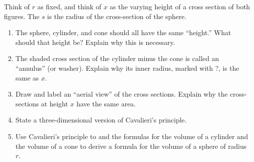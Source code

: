 \documentclass[nooutcomes]{ximera}
\begin{document}
\begin{problem}
\begin{center}
{}
\end{center}
Think of $r$ as fixed, and think of $x$ as the varying height of a cross section of both figures.  The $s$ is the radius of the cross-section of the sphere.  
\begin{enumerate}
\item The sphere, cylinder, and cone should all have the same ``height.''  What should that height be?  Explain why this is necessary.  
\item The shaded cross section of the cylinder minus the cone is called an ``annulus'' (or washer).  Explain why its inner radius, marked with $?$, is the same as $x$. 
\item Draw and label an ``aerial view'' of the cross sections.   Explain why the cross-sections at height $x$ have the same area.  
\item State a three-dimensional version of Cavalieri's principle.  
\item Use Cavalieri's principle to and the formulas for the volume of a cylinder and the volume of a cone to derive a formula for the volume of a sphere of radius $r$.  
\end{enumerate}
\end{problem}
\end{document}
